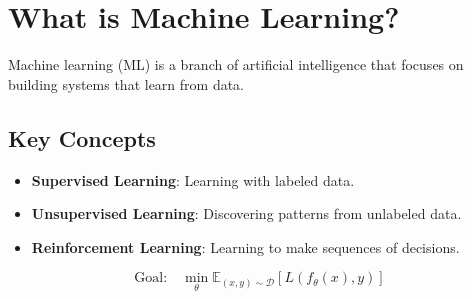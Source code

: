\section{What is Machine Learning?}

Machine learning (ML) is a branch of artificial intelligence that focuses on building systems that learn from data.

\subsection{Key Concepts}

\begin{itemize}
\item \textbf{Supervised Learning}: Learning with labeled data.
\item \textbf{Unsupervised Learning}: Discovering patterns from unlabeled data.
\item \textbf{Reinforcement Learning}: Learning to make sequences of decisions.
\end{itemize}

\[
\text{Goal:} \quad \min_{\theta} \mathbb{E}_{(x, y) \sim \mathcal{D}} \left[ L(f_{\theta}(x), y) \right]
\]
